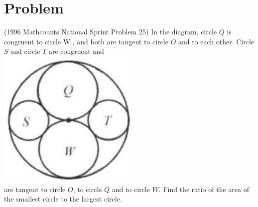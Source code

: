 \documentclass{article}
\begin{document}
\section*{Problem}
(1996 Mathcounts National Sprint Problem 25) In the diagram, circle \(Q\) is congruent to circle W , and both are tangent to circle \(O\) and to each other. Circle \(S\) and circle \(T\) are congruent and\\
\centering
\includegraphics[width=\textwidth]{images/185(4).jpg}\\
are tangent to circle \(O\), to circle \(Q\) and to circle \(W\). Find the ratio of the area of the smallest circle to the largest circle.
\end{document}
